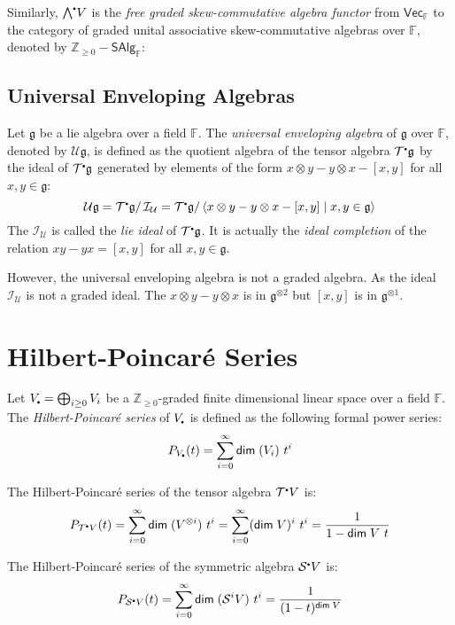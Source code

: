 \documentclass[
	11pt, %
	fleqn, %
	a4paper, %
]{LegrandOrangeBook}
\newcommand{\smallbullet}{\scalebox{0.5}{$\bullet$}}
\newcommand{\quotient}[2]{#1/\, #2} %
\newcommand{\F}{\mathbb{F}} %
\newcommand{\Vect}{\boldsymbol{\mathsf{Vec}}} %
\newcommand{\T}{\mathcal{T}^{\smallbullet}} %
\newcommand{\Sym}{\mathcal{S}^{\smallbullet}} %
\newcommand{\Ext}{{\bigwedge}^{\smallbullet}} %
\newcommand{\Env}{\mathcal{U}} %
\newcommand{\ideal}{\mathcal{I}} %
\newcommand{\Z}{\mathbb{Z}} %
\newcommand{\SAlg}{\boldsymbol{\mathsf{SAlg}}} %
\renewcommand{\dim}{\mathsf{dim\;}} %
\begin{document}
Similarly, $\Ext V$ is the \emph{free graded skew-commutative algebra functor} from $\Vect_{\F}$ to the category of graded unital associative skew-commutative algebras over $\F$, denoted by $\Z_{\geq 0} - \SAlg_{\F}$:

\subsection{Universal Enveloping Algebras}

Let $\mathfrak{g}$ be a lie algebra over a field $\F$. The \emph{universal enveloping algebra} of $\mathfrak{g}$ over $\F$, denoted by $\Env \mathfrak{g}$, is defined as the quotient algebra of the tensor algebra $\T \mathfrak{g}$ by the ideal of $\T \mathfrak{g}$ generated by elements of the form $x \otimes y - y \otimes x - [x, y]$ for all $x, y \in \mathfrak{g}$:
\[
    \Env \mathfrak{g} = \quotient{\T \mathfrak{g}}{\ideal_{\Env}} = \quotient{\T \mathfrak{g}}{\langle x \otimes y - y \otimes x - [x, y] \mid x, y \in \mathfrak{g} \rangle}
\]
The $\ideal_{\Env}$ is called the \emph{lie ideal} of $\T \mathfrak{g}$. It is actually the \emph{ideal completion} of the relation $xy - yx = [x, y]$ for all $x, y \in \mathfrak{g}$.
\begin{remark}
    However, the universal enveloping algebra is not a graded algebra. As the ideal $\ideal_{\Env}$ is not a graded ideal. The $x \otimes y - y \otimes x$ is in $\mathfrak{g}^{\otimes 2}$ but $[x, y]$ is in $\mathfrak{g}^{\otimes 1}$.
\end{remark}

\newpage

\section{Hilbert-Poincaré Series}
Let $V_{\smallbullet} = \bigoplus_{i \geq 0} V_i$ be a $\Z_{\geq 0}$-graded finite dimensional linear space over a field $\F$. The \emph{Hilbert-Poincaré series} of $V_{\smallbullet}$ is defined as the following formal power series:
\[
    P_{V_{\smallbullet}}(t) = \sum_{i = 0}^{\infty} \dim(V_i)\ t^i
\]

\begin{example}
    The Hilbert-Poincaré series of the tensor algebra $\T V$ is:
    \[
        P_{\T V}(t) = \sum_{i = 0}^{\infty} \dim(V^{\otimes i})\ t^i = \sum_{i = 0}^{\infty} (\dim{V})^i\ t^i = \frac{1}{1 - \dim{V}\ t}
    \]
\end{example}

\begin{example}
    The Hilbert-Poincaré series of the symmetric algebra $\Sym V$ is:
    \[
        P_{\Sym V}(t) = \sum_{i = 0}^{\infty} \dim(\mathcal{S}^i V)\ t^i = \frac{1}{(1 - t)^{\dim{V}}}
    \]
\end{example}
\end{document}
